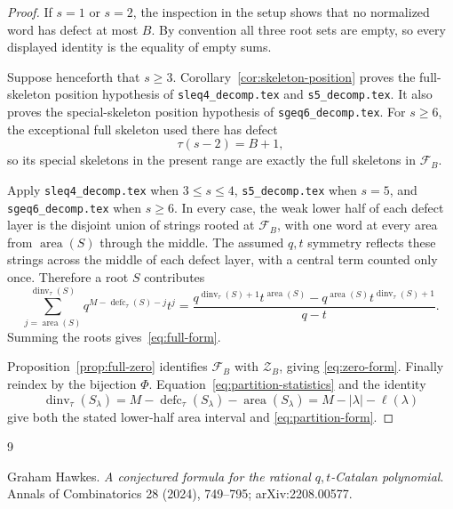 \documentclass[11pt]{article}
\theoremstyle{definition}
\theoremstyle{remark}
\newcommand{\area}{\operatorname{area}}
\newcommand{\dinv}{\operatorname{dinv}}
\newcommand{\defc}{\operatorname{defc}}
\begin{document}
\begin{proof}
If $s=1$ or $s=2$, the inspection in the setup shows that no normalized word
has defect at most $B$.  By convention all three root sets are empty, so
every displayed identity is the equality of empty sums.

Suppose henceforth that $s\ge3$.  Corollary~\ref{cor:skeleton-position}
proves the full-skeleton position hypothesis of
\texttt{sleq4\_decomp.tex} and \texttt{s5\_decomp.tex}.  It also proves the
special-skeleton position hypothesis of \texttt{sgeq6\_decomp.tex}.  For
$s\ge6$, the exceptional full skeleton used there has defect
\[
 \tau(s-2)=B+1,
\]
so its special skeletons in the present range are exactly the full skeletons
in $\mathcal F_B$.

Apply \texttt{sleq4\_decomp.tex} when $3\le s\le4$,
\texttt{s5\_decomp.tex} when $s=5$, and
\texttt{sgeq6\_decomp.tex} when $s\ge6$.  In every case, the weak lower half
of each defect layer is the disjoint union of strings rooted at
$\mathcal F_B$, with one word at every area from $\area(S)$ through the
middle.  The assumed $q,t$ symmetry reflects these strings across the
middle of each defect layer, with a central term counted only once.
Therefore a root $S$ contributes
\[
 \sum_{j=\area(S)}^{\dinv_\tau(S)}
 q^{M-\defc_\tau(S)-j}t^j
 =
 \frac{
 q^{\dinv_\tau(S)+1}t^{\area(S)}
 -q^{\area(S)}t^{\dinv_\tau(S)+1}
 }{q-t}.
\]
Summing the roots gives~\eqref{eq:full-form}.

Proposition~\ref{prop:full-zero} identifies $\mathcal F_B$ with
$\mathcal Z_B$, giving \eqref{eq:zero-form}.  Finally reindex by the bijection
$\Phi$.  Equation~\eqref{eq:partition-statistics} and the identity
\[
 \dinv_\tau(S_\lambda)
 =M-\defc_\tau(S_\lambda)-\area(S_\lambda)
 =M-|\lambda|-\ell(\lambda)
\]
give both the stated lower-half area interval and
\eqref{eq:partition-form}.
\end{proof}

\begin{thebibliography}{9}

Graham Hawkes.
\newblock \emph{A conjectured formula for the rational $q,t$-Catalan
polynomial}.
\newblock Annals of Combinatorics 28 (2024), 749--795;
arXiv:2208.00577.

\end{thebibliography}
\end{document}

